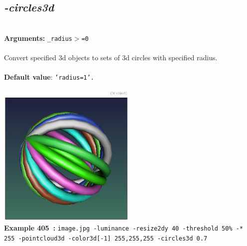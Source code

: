 \documentclass[a4paper,11pt,twoside]{book}
\begin{document}
\subsection{\emph{-circles3d} }\vspace*{-0.5em}
~\\\textbf{Arguments: } 
{\small \texttt{\_radius$>$=0}}\\~\\
Convert specified 3d objects to sets of 3d circles with specified radius.
~\\~\\\textbf{Default value}: {\small \texttt{'radius=1'.}}
\begin{center}\includegraphics[keepaspectratio=true,height=7cm,width=\textwidth]{img/gmic_def405.jpg}\\
{\footnotesize \textbf{Example 405~:} \texttt{image.jpg -luminance -resize2dy 40 -threshold 50\% -* 255 -pointcloud3d -color3d[-1] 255,255,255 -circles3d 0.7}}
\end{center}
\end{document}
